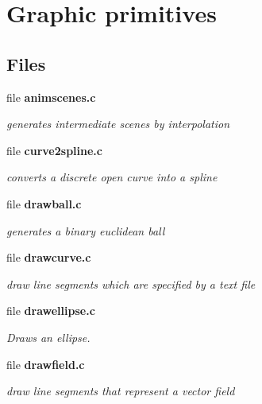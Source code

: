 \section{Graphic primitives}
\label{group__draw}
\subsection*{Files}
\begin{CompactItemize}
\item 
file \bf{animscenes.c}
\begin{CompactList}\small\item\em generates intermediate scenes by interpolation \item\end{CompactList}

\item 
file \bf{curve2spline.c}
\begin{CompactList}\small\item\em converts a discrete open curve into a spline \item\end{CompactList}

\item 
file \bf{drawball.c}
\begin{CompactList}\small\item\em generates a binary euclidean ball \item\end{CompactList}

\item 
file \bf{drawcurve.c}
\begin{CompactList}\small\item\em draw line segments which are specified by a text file \item\end{CompactList}

\item 
file \bf{drawellipse.c}
\begin{CompactList}\small\item\em Draws an ellipse. \item\end{CompactList}

\item 
file \bf{drawfield.c}
\begin{CompactList}\small\item\em draw line segments that represent a vector field \item\end{CompactList}


\end{CompactItemize}
